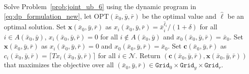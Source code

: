 \documentclass[mnsc,non-blindrev]{informs3}
\theoremstyle{definition}
\begin{document}
\begin{appendices}{\Large{}}
{\begin{algorithm}
\SingleSpacedXI
\caption{FPTAS for Problem~\eqref{prob:joint_inventory_assortment_ub}}
\label{alg:fptas_joint_ub_new}
\begin{algorithmic}
\State Solve Problem~\eqref{prob:joint_ub_6} using the dynamic program in \eqref{eq:dp_formulation_new}, let $\text{OPT}(\bar{x}_0,\bar{y},\bar{r})$ be the optimal value and $\hat{\ell}$ be an optimal solution.
\State Set $\bm{x}(\bar{x}_0,\bar{y},\bar{r})$ as $x_i(\bar{x}_0,\bar{y},\bar{r})=\bar{x}_i^{\hat{\ell}_i}/(1+\delta)$ for all $i\in A(\bar{x}_0,\bar{y})$, $x_i(\bar{x}_0,\bar{y},\bar{r})=0$ for all $i\notin A(\bar{x}_0,\bar{y})$ and $x_0(\bar{x}_0,\bar{y},\bar{r})=\bar{x}_0$.
\Else 
\State Set $\bm{x}(\bar{x}_0,\bar{y},\bar{r})$ as $x_i(\bar{x}_0,\bar{y},\bar{r})=0$ and $x_0(\bar{x}_0,\bar{y},\bar{r})=\bar{x}_0$.
\EndIf
\State Set $\bm{c}(\bar{x}_0,\bar{y},\bar{r})$ as $c_i(\bar{x}_0,\bar{y},\bar{r})=\lceil Tx_i(\bar{x}_0,\bar{y},\bar{r})\rceil$ for all $i\in\mathcal{N}$.
\EndFor
\State Return $(\bm{c}(\bar{x}_0,\bar{y},\bar{r}),\bm{x}(\bar{x}_0,\bar{y},\bar{r}))$ that maximizes the objective over all $(\bar{x}_0,\bar{y},\bar{r})\in\texttt{Grid}_0\times \texttt{Grid}_y\times \texttt{Grid}_r$.
\end{algorithmic}
\end{algorithm}

}
\end{appendices}
\end{document}

